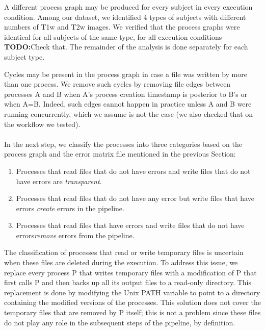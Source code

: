 \documentclass{article}
\newcommand{\todo}[1]{\color{red}\textbf{TODO:}#1\color{black}}
\begin{document}
 \label{myfig1}
\medskip

A different process graph may be produced for every subject in every
execution condition. Among our dataset, we identified 4 types of
subjects with different numbers of T1w and T2w images. We verified
that the process graphs were identical for all subjects of the same
type, for all execution conditions \todo{Check that}. The remainder of
the analysis is done separately for each subject type.

Cycles may be present in the process graph in case a file was written 
by more than one process. We remove such cycles by removing file edges 
between processes A and B when A's process creation timestamp is 
posterior to B's or when A=B. Indeed, such edges cannot happen in 
practice unless A and B were running concurrently, which we assume is 
not the case (we also checked that on the workflow we tested). 

\paragraph{} In the next step, we classify the processes into three 
categories based on the process graph and the error matrix file 
mentioned in the previous Section:
\begin{enumerate}
\item Processes 
that read files that do not have errors and write files that do not 
have errors are \emph{transparent}.
\item Processes that read files 
that do not have any error but write files that have errors 
\emph{create} errors in the pipeline.
\item Processes that read files 
that have errors and write files that do not have errors\emph{remove} 
errors from the pipeline.
\end{enumerate}

The classification of processes that read or write temporary files is 
uncertain when these files are deleted during the execution. To address 
this issue, we replace every process P that writes temporary files with 
a modification of P that first calls P and then backs up all its output 
files to a read-only directory. This replacement is done by modifying 
the Unix PATH variable to point to a directory containing the modified
versions of the processes. This solution does not cover the temporary files
that are removed by P itself; this is not a problem since these files do not
play any role in the subsequent steps of the pipeline, by definition.
\end{document}
